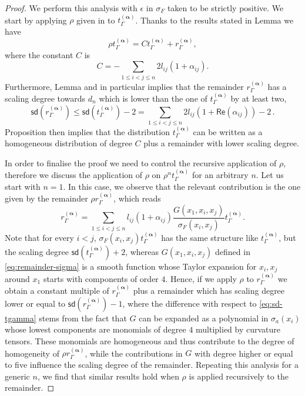 \documentclass[11pt]{book}
\newcommand{\com}[1]{{\color{red}\bf #1}}
\newcommand{\sd}{\mathsf{sd}}
\renewcommand{\Re}{\mathsf{Re}}
\newcommand{\alphabd}{\boldsymbol{\alpha}}
\theoremstyle{break}
\begin{document}
\com{
\begin{proof}
We perform this analysis with $\epsilon$ in $\sigma_F$ taken to be strictly positive. We start by applying $\rho$ given in %
to $t_\Gamma^{(\alphabd)}$. Thanks to the results stated in Lemma %
we have
\[
\rho t_\Gamma^{(\alphabd)}  =    C   t_\Gamma^{(\alphabd)}    + r^{(\alphabd)}_\Gamma,
\]
where the constant $C$ is
\[
C= -\sum_{1\leq i<j\leq n} 2 l_{ij}(1+ \alpha_{ij}).
\]
Furthermore, Lemma %
and in particular %
implies that the remainder $r^{(\alphabd)}_\Gamma$ has a scaling degree towards $d_n$ which is lower than the one of $t_\Gamma^{(\alphabd)}$ by at least two, 
\begin{equation}\label{eq:sd-tgamma}
\sd(r^{(\alphabd)}_\Gamma) \leq \sd(t_\Gamma^{(\alphabd)})-2 = \sum_{1\leq i<j\leq n} 2 l_{ij}(1+ \Re(\alpha_{ij})) -2\,.
\end{equation}
Proposition %
then implies that the distribution $t_\Gamma^{(\alphabd)}$ can be written as a homogeneous distribution of degree $C$  
plus a remainder with lower scaling degree.

In order to finalise the proof we need to control the recursive application of $\rho$, therefore we discuss the application of $\rho$ on $\rho^nt_\Gamma^{(\alphabd)}$ for an arbitrary $n$. 
Let us start with $n=1$. In this case, we observe that the relevant contribution is the one given by the remainder $\rho r^{(\alphabd)}_\Gamma$, which reads 
\[
r^{(\alphabd)}_\Gamma = \sum_{1\leq i < j \leq n} l_{ij}(1+ \alpha_{ij}) \frac{G(x_1,x_i,x_j)}{\sigma_F(x_i,x_j)}t_\Gamma^{(\alphabd)}.
\]
Note that for every $i<j$, $\sigma_F(x_i,x_j)t_\Gamma^{(\alphabd)}$ has the same structure like $t_\Gamma^{(\alphabd)}$, but the scaling degree $\sd(t_\Gamma^{(\alphabd)}) +2$, whereas $G(x_1,x_i,x_j)$ defined in \eqref{eq:remainder-sigma} is a smooth function whose Taylor expansion for $x_i, x_j$ around $x_1$ starts with components of order $4$. Hence, if we apply $\rho$ to $r^{(\alphabd)}_\Gamma$ we obtain
a constant multiple of $r^{(\alphabd)}_\Gamma$ plus a remainder which has scaling degree lower or equal to $\sd(r^{(\alphabd)}_\Gamma)-1$, where the difference with respect to \eqref{eq:sd-tgamma} stems from the fact that $G$ can be expanded as a polynomial in $\sigma_a(x_i)$ whose lowest components are monomials of degree $4$ multiplied by curvature tensors. These monomials are homogeneous and thus contribute to the degree of homogeneity of $\rho r^{(\alphabd)}_\Gamma$, while the contributions in $G$ with degree higher or equal to five influence the scaling degree of the remainder.
Repeating this analysis for a generic $n$, we find that similar results hold when $\rho$ is applied recursively to the remainder.


\end{proof}}
\end{document}

